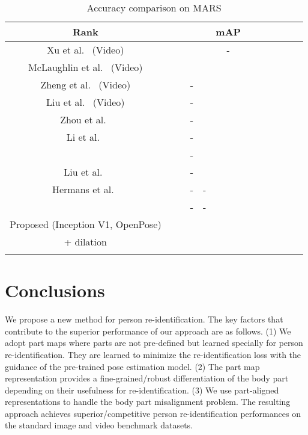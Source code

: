\documentclass{llncs}
\begin{document}
\begin{table}[t]
\setlength{\tabcolsep}{5pt}
\centering
\caption{\small Accuracy comparison on MARS}\vspace{-.3cm}
\label{table:result_mars}
\resizebox{0.70\linewidth}{!}
{
\begin{tabular}[pos]{|Sl| |Sc|Sc|Sc|Sc|Sc|}
\hline
Rank &  &  &  &  & mAP\\
\hline\hline
Xu et al.~\cite{conf/iccv/xu17} (Video) &  &  &  &  & - \\
McLaughlin et al.~\cite{conf/cvpr/mclaughlin16} (Video) &  &  &  &  & \\
Zheng et al.~\cite{ZhengBSWSWT16} (Video) &  &  & - &  & \\
Liu et al.~\cite{journal/arxiv/liu17} (Video) &  &  & - &  & \\
Zhou et al.~\cite{conf/cvpr/zhou17} &  &  & - &  &  \\
Li et al.~\cite{conf/cvpr/li17} &  &  & - &  & \\
\quad{} & {\color{blue}} & {\color{blue}} & {\color{blue}-} & {\color{blue}} & {\color{blue}}\\
Liu et al.~\cite{conf/cvpr/liu17} &  &  & - &  & \\
Hermans et al.~\cite{journal/arxiv/hermans17}&  &  & - & - & \\
\quad{} & {\color{blue}} & {\color{blue}} & {\color{blue}-} & {\color{blue}-} & {\color{blue}} \\
\hline
Proposed (Inception V1, OpenPose)  &  &  &  &  &   \\
\quad\quad + dilation&  &  &  &  &  \\
\quad{} & {\color{blue}} & {\color{blue}} & {\color{blue}} & {\color{blue}} &  {\color{blue}} \\
\hline
\end{tabular}}\vspace{-.5cm}
\end{table}

\section{Conclusions}
We propose a new method for person re-identification.  The key factors that contribute to the superior performance of our approach
are as follows. (1) We adopt part maps where parts are not pre-defined but learned specially for person re-identification. They are learned to minimize the re-identification loss with the guidance of the pre-trained pose estimation model. (2) {\color{black}The part map representation provides a fine-grained/robust differentiation of the body part depending on their usefulness for re-identification.} (3) We use part-aligned representations to handle the body part misalignment problem. The resulting approach achieves superior/competitive person re-identification performances on the standard image and video benchmark datasets.
\end{document}
